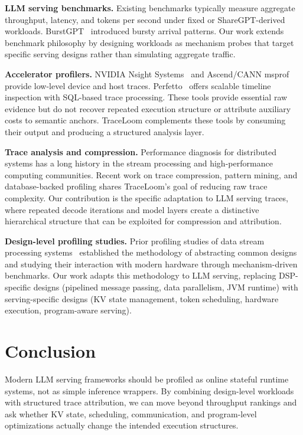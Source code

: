 \documentclass[conference]{IEEEtran}
\begin{document}
\textbf{LLM serving benchmarks.} Existing benchmarks typically measure
aggregate throughput, latency, and tokens per second under fixed or
ShareGPT-derived workloads. BurstGPT~\cite{burstgpt} introduced bursty arrival
patterns. Our work extends benchmark philosophy by designing workloads as
mechanism probes that target specific serving designs rather than simulating
aggregate traffic.

\textbf{Accelerator profilers.} NVIDIA Nsight Systems~\cite{nsight} and
Ascend/CANN msprof~\cite{cann} provide low-level device and host traces.
Perfetto~\cite{perfetto} offers scalable timeline inspection with SQL-based
trace processing. These tools provide essential raw evidence but do not
recover repeated execution structure or attribute auxiliary costs to semantic
anchors. TraceLoom complements these tools by consuming their output and
producing a structured analysis layer.

\textbf{Trace analysis and compression.} Performance diagnosis for
distributed systems has a long history in the stream processing and
high-performance computing communities. Recent work on trace compression,
pattern mining, and database-backed profiling shares TraceLoom's goal of
reducing raw trace complexity. Our contribution is the specific adaptation to
LLM serving traces, where repeated decode iterations and model layers create
a distinctive hierarchical structure that can be exploited for compression and
attribution.

\textbf{Design-level profiling studies.} Prior profiling studies of data
stream processing systems~\cite{dsp-profiling} established the methodology of
abstracting common designs and studying their interaction with modern hardware
through mechanism-driven benchmarks. Our work adapts this methodology to LLM
serving, replacing DSP-specific designs (pipelined message passing, data
parallelism, JVM runtime) with serving-specific designs (KV state management,
token scheduling, hardware execution, program-aware serving).


\section{Conclusion}

Modern LLM serving frameworks should be profiled as online stateful runtime
systems, not as simple inference wrappers. By combining design-level workloads
with structured trace attribution, we can move beyond throughput rankings and
ask whether KV state, scheduling, communication, and program-level
optimizations actually change the intended execution structures.
\end{document}
